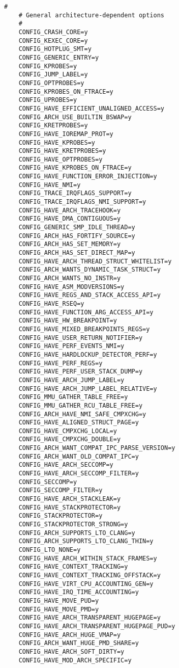 \begin{multicols}{2}
\begin{lstlisting}[caption=kernel config,label=kconfig,]
    #
    # General architecture-dependent options
    #
    CONFIG_CRASH_CORE=y
    CONFIG_KEXEC_CORE=y
    CONFIG_HOTPLUG_SMT=y
    CONFIG_GENERIC_ENTRY=y
    CONFIG_KPROBES=y
    CONFIG_JUMP_LABEL=y
    CONFIG_OPTPROBES=y
    CONFIG_KPROBES_ON_FTRACE=y
    CONFIG_UPROBES=y
    CONFIG_HAVE_EFFICIENT_UNALIGNED_ACCESS=y
    CONFIG_ARCH_USE_BUILTIN_BSWAP=y
    CONFIG_KRETPROBES=y
    CONFIG_HAVE_IOREMAP_PROT=y
    CONFIG_HAVE_KPROBES=y
    CONFIG_HAVE_KRETPROBES=y
    CONFIG_HAVE_OPTPROBES=y
    CONFIG_HAVE_KPROBES_ON_FTRACE=y
    CONFIG_HAVE_FUNCTION_ERROR_INJECTION=y
    CONFIG_HAVE_NMI=y
    CONFIG_TRACE_IRQFLAGS_SUPPORT=y
    CONFIG_TRACE_IRQFLAGS_NMI_SUPPORT=y
    CONFIG_HAVE_ARCH_TRACEHOOK=y
    CONFIG_HAVE_DMA_CONTIGUOUS=y
    CONFIG_GENERIC_SMP_IDLE_THREAD=y
    CONFIG_ARCH_HAS_FORTIFY_SOURCE=y
    CONFIG_ARCH_HAS_SET_MEMORY=y
    CONFIG_ARCH_HAS_SET_DIRECT_MAP=y
    CONFIG_HAVE_ARCH_THREAD_STRUCT_WHITELIST=y
    CONFIG_ARCH_WANTS_DYNAMIC_TASK_STRUCT=y
    CONFIG_ARCH_WANTS_NO_INSTR=y
    CONFIG_HAVE_ASM_MODVERSIONS=y
    CONFIG_HAVE_REGS_AND_STACK_ACCESS_API=y
    CONFIG_HAVE_RSEQ=y
    CONFIG_HAVE_FUNCTION_ARG_ACCESS_API=y
    CONFIG_HAVE_HW_BREAKPOINT=y
    CONFIG_HAVE_MIXED_BREAKPOINTS_REGS=y
    CONFIG_HAVE_USER_RETURN_NOTIFIER=y
    CONFIG_HAVE_PERF_EVENTS_NMI=y
    CONFIG_HAVE_HARDLOCKUP_DETECTOR_PERF=y
    CONFIG_HAVE_PERF_REGS=y
    CONFIG_HAVE_PERF_USER_STACK_DUMP=y
    CONFIG_HAVE_ARCH_JUMP_LABEL=y
    CONFIG_HAVE_ARCH_JUMP_LABEL_RELATIVE=y
    CONFIG_MMU_GATHER_TABLE_FREE=y
    CONFIG_MMU_GATHER_RCU_TABLE_FREE=y
    CONFIG_ARCH_HAVE_NMI_SAFE_CMPXCHG=y
    CONFIG_HAVE_ALIGNED_STRUCT_PAGE=y
    CONFIG_HAVE_CMPXCHG_LOCAL=y
    CONFIG_HAVE_CMPXCHG_DOUBLE=y
    CONFIG_ARCH_WANT_COMPAT_IPC_PARSE_VERSION=y
    CONFIG_ARCH_WANT_OLD_COMPAT_IPC=y
    CONFIG_HAVE_ARCH_SECCOMP=y
    CONFIG_HAVE_ARCH_SECCOMP_FILTER=y
    CONFIG_SECCOMP=y
    CONFIG_SECCOMP_FILTER=y
    CONFIG_HAVE_ARCH_STACKLEAK=y
    CONFIG_HAVE_STACKPROTECTOR=y
    CONFIG_STACKPROTECTOR=y
    CONFIG_STACKPROTECTOR_STRONG=y
    CONFIG_ARCH_SUPPORTS_LTO_CLANG=y
    CONFIG_ARCH_SUPPORTS_LTO_CLANG_THIN=y
    CONFIG_LTO_NONE=y
    CONFIG_HAVE_ARCH_WITHIN_STACK_FRAMES=y
    CONFIG_HAVE_CONTEXT_TRACKING=y
    CONFIG_HAVE_CONTEXT_TRACKING_OFFSTACK=y
    CONFIG_HAVE_VIRT_CPU_ACCOUNTING_GEN=y
    CONFIG_HAVE_IRQ_TIME_ACCOUNTING=y
    CONFIG_HAVE_MOVE_PUD=y
    CONFIG_HAVE_MOVE_PMD=y
    CONFIG_HAVE_ARCH_TRANSPARENT_HUGEPAGE=y
    CONFIG_HAVE_ARCH_TRANSPARENT_HUGEPAGE_PUD=y
    CONFIG_HAVE_ARCH_HUGE_VMAP=y
    CONFIG_ARCH_WANT_HUGE_PMD_SHARE=y
    CONFIG_HAVE_ARCH_SOFT_DIRTY=y
    CONFIG_HAVE_MOD_ARCH_SPECIFIC=y

\end{lstlisting}
\end{multicols}
